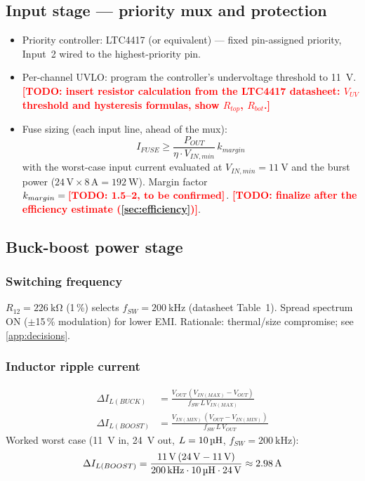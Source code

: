 \documentclass[11pt,a4paper]{article}
\newcommand{\todo}[1]{\textcolor{red}{\textbf{[TODO: #1]}}}
\begin{document}
\subsection{Input stage --- priority mux and protection}
\begin{itemize}[nosep]
  \item Priority controller: LTC4417 (or equivalent) --- fixed pin-assigned
        priority, Input~2 wired to the highest-priority pin.
  \item Per-channel UVLO: program the controller's undervoltage threshold to
        \SI{11}{\V}. \todo{insert resistor calculation from the LTC4417
        datasheet: $V_{UV}$ threshold and hysteresis formulas, show $R_{top}$, $R_{bot}$.}
  \item Fuse sizing (each input line, ahead of the mux):
        \begin{equation}
          I_{FUSE} \ge \frac{P_{OUT}}{\eta \cdot V_{IN,min}} \, k_{margin}
        \end{equation}
        with the worst-case input current evaluated at $V_{IN,min} = \SI{11}{\V}$
        and the burst power ($24\,\text{V} \times 8\,\text{A} = \SI{192}{\W}$).
        Margin factor $k_{margin} = \todo{1.5--2, to be confirmed}$.
        \todo{finalize after the efficiency estimate (\autoref{sec:efficiency})}.
\end{itemize}

\subsection{Buck-boost power stage}

\subsubsection{Switching frequency}
$R_{12} = \SI{226}{\kilo\ohm}$ (1\,\%) selects $f_{SW} = \SI{200}{\kHz}$
(datasheet Table~1). Spread spectrum ON ($\pm$15\,\% modulation) for lower EMI.
Rationale: thermal/size compromise; see \autoref{app:decisions}.

\subsubsection{Inductor ripple current}
\begin{align}
  \Delta I_{L(BUCK)}  &= \frac{V_{OUT}\,(V_{IN(MAX)} - V_{OUT})}{f_{SW}\,L\,V_{IN(MAX)}} \\[2pt]
  \Delta I_{L(BOOST)} &= \frac{V_{IN(MIN)}\,(V_{OUT} - V_{IN(MIN)})}{f_{SW}\,L\,V_{OUT}}
\end{align}
Worked worst case (\SI{11}{\V} in, \SI{24}{\V} out, $L = \SI{10}{\uH}$,
$f_{SW} = \SI{200}{\kHz}$):
\begin{equation}
  \Delta I_{L(BOOST)} = \frac{\SI{11}{\V}\,(\SI{24}{\V}-\SI{11}{\V})}
                             {\SI{200}{\kHz}\cdot\SI{10}{\uH}\cdot\SI{24}{\V}}
                       \approx \SI{2.98}{\A}
\end{equation}
\end{document}
